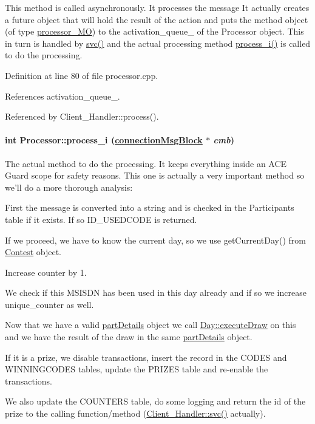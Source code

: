 This method is called asynchronously. It processes the message It actually creates a future object that will hold the result of the action and puts the method object (of type \hyperlink{classprocessor__MO}{processor\_\-MO}) to the activation\_\-queue\_\- of the Processor object. This in turn is handled by \hyperlink{classProcessor_Processora4}{svc()} and the actual processing method \hyperlink{classProcessor_Processora6}{process\_\-i()} is called to do the processing. 

Definition at line 80 of file processor.cpp.

References activation\_\-queue\_\-.

Referenced by Client\_\-Handler::process().\hypertarget{classProcessor_Processora6}{
\paragraph[process\_\-i]{\setlength{\rightskip}{0pt plus 5cm}int Processor::process\_\-i (\hyperlink{classconnectionMsgBlock}{connection\-Msg\-Block} $\ast$ {\em cmb})}\hfill}
\label{classProcessor_Processora6}


The actual method to do the processing. It keeps everything inside an ACE Guard scope for safety reasons. This one is actually a very important method so we'll do a more thorough analysis:\begin{CompactItemize}
\item 
First the message is converted into a string and is checked in the Participants table if it exists. If so ID\_\-USEDCODE is returned.\item 
If we proceed, we have to know the current day, so we use get\-Current\-Day() from \hyperlink{classContest}{Contest} object.\item 
Increase counter by 1.\item 
We check if this MSISDN has been used in this day already and if so we increase unique\_\-counter as well.\item 
Now that we have a valid \hyperlink{classpartDetails}{part\-Details} object we call \hyperlink{classDay_Daya8}{Day::execute\-Draw} on this and we have the result of the draw in the same \hyperlink{classpartDetails}{part\-Details} object.\item 
If it is a prize, we disable transactions, insert the record in the CODES and WINNINGCODES tables, update the PRIZES table and re-enable the transactions.\item 
We also update the COUNTERS table, do some logging and return the id of the prize to the calling function/method (\hyperlink{classClient__Handler_Client__Handlerb0}{Client\_\-Handler::svc()} actually). \end{CompactItemize}


